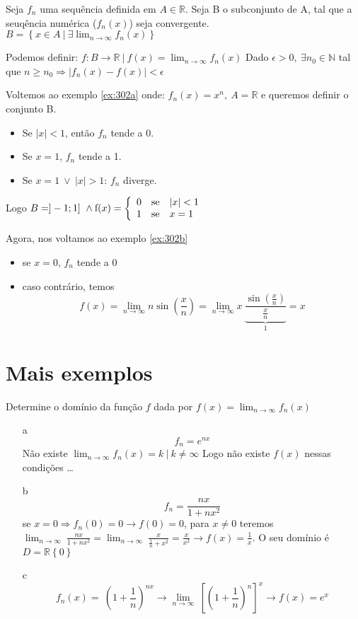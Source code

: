 \documentclass[12pt,openany]{book}
\newcommand{\LI}[1][n]{\lim_{{#1} \rightarrow \infty}}
\begin{document}
Seja $f_n$ uma sequência definida em $A \in \mathds{R}$. Seja B o subconjunto de A, tal que a seuqência numérica ($f_n(x)$) seja convergente. $B = \left\{x \in A\ | \ \exists \lim_{n \rightarrow \infty} f_n(x) \right\}$

Podemos definir: $f: B \rightarrow \mathds{R} \ | \ f(x) = \displaystyle{\lim_{n \rightarrow \infty} f_n(x)}$ Dado $\epsilon > 0, \ \exists n_0 \in \mathds{N}$ tal que $n \geq n_0 \Rightarrow |f_n(x) - f(x)| < \epsilon$

Voltemos ao exemplo \ref{ex:302a} onde: $f_n(x) = x^n, \ A = \mathds{R}$ e queremos definir o conjunto B.

\begin{itemize}
\item Se $|x| < 1$, então $f_n$ tende a 0.
\item Se $x=1$, $f_n$ tende a 1.
\item Se $x=1 \ \lor \ |x| > 1$: $f_n$ diverge.
\end{itemize}
Logo $B = ]-1;1]\ \land \hbox{f}(x)
= \left\{ \begin{array}{rll}
0 & \hbox{se} &  |x| < 1 \\
1 & \hbox{se} &  x  = 1 \\
\end{array}\right.$

Agora, nos voltamos ao exemplo \ref{ex:302b}
\begin{itemize}
\item se $x=0$, $f_n$ tende a 0
\item caso contrário, temos $$f(x) = \lim_{n \rightarrow \infty} n \sin \left(\frac{x}{n}\right) = \LI x \ \underbrace{\frac{\sin(\frac{x}{n})}{\frac{x}{n}}}_1 = x$$
\end{itemize}

\section*{Mais exemplos} Determine o domínio da função $f$ dada por $\displaystyle{f(x) = \LI f_n(x)}$

\begin{itemize}
\item [a] $$f_n= e^{nx}$$ 
 Não existe $\displaystyle{ \LI f_n(x) = k \ | \ k \neq \infty}$ Logo não existe $f(x)$ nessas condições \ldots
 \item [b] $$f_n= \frac{nx}{1+nx^2}$$
 se $x=0 \Rightarrow f_n(0) = 0 \rightarrow f(0) = 0$, para $x \neq 0$ teremos $\displaystyle{\LI \ \frac{nx}{1+nx^2} = \LI \ \frac{x}{\frac{1}{n}+x^2} = \frac{x}{x^2} \rightarrow f(x) = \frac{1}{x}}$. O seu domínio é $D = \mathds{R} \left\{0\right\}$
 \item [c] $$f_n(x) = \ \left( 1 + \frac{1}{n} \right)^{nx} \rightarrow \LI \ \left[ \left( 1 + \frac{1}{n} \right)^n \right]^x \rightarrow f(x) = e^x$$
\end{itemize}
\end{document}
